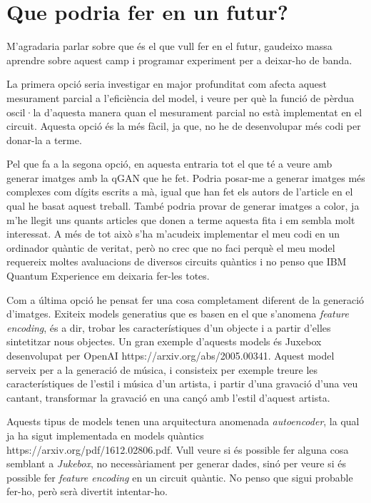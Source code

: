 \chapter{Que podria fer en un futur?}
M'agradaria parlar sobre que és el que vull fer en el futur, gaudeixo massa aprendre sobre aquest camp i programar experiment per a deixar-ho de banda.

La primera opció seria investigar en major profunditat com afecta aquest mesurament parcial a l'eficiència del model, i veure per què la funció de pèrdua oscil·la d'aquesta manera quan el mesurament parcial no està implementat en el circuit. Aquesta opció és la més fàcil, ja que, no he de desenvolupar més codi per donar-la a terme.

Pel que fa a la segona opció, en aquesta entraria tot el que té a veure amb generar imatges amb la qGAN que he fet. Podria posar-me a generar imatges més complexes com dígits escrits a mà, igual que han fet els autors de l'article en el qual he basat aquest treball. També podria provar de generar imatges a color, ja m'he llegit uns quants articles que donen a terme aquesta fita i em sembla molt interessat. A més de tot això s'ha m'acudeix implementar el meu codi en un ordinador quàntic de veritat, però no crec que no faci perquè el meu model requereix moltes avaluacions de diversos circuits quàntics i no penso que IBM Quantum Experience em deixaria fer-les totes.

Com a última opció he pensat fer una cosa completament diferent de la generació d'imatges. Exiteix models generatius que es basen en el que s'anomena \textit{feature encoding}, és a dir, trobar les característiques d'un objecte i a partir d'elles sintetitzar nous objectes. Un gran exemple d'aquests models és Juxebox desenvolupat per OpenAI https://arxiv.org/abs/2005.00341. Aquest model serveix per a la generació de música, i consisteix per exemple treure les característiques de l'estil i música d'un artista, i partir d'una gravació d'una veu cantant, transformar la gravació en una cançó amb l'estil d'aquest artista.

Aquests tipus de models tenen una arquitectura anomenada \textit{autoencoder}, la qual ja ha sigut implementada en models quàntics https://arxiv.org/pdf/1612.02806.pdf. Vull veure si és possible fer alguna cosa semblant a \textit{Jukebox}, no necessàriament per generar dades, sinó per veure si és possible fer \textit{feature encoding} en un circuit quàntic. No penso que sigui probable fer-ho, però serà divertit intentar-ho. 

